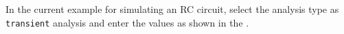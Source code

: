 In the current example for simulating an RC circuit, select the analysis type as {\tt transient} analysis and enter the values as shown in the .  

